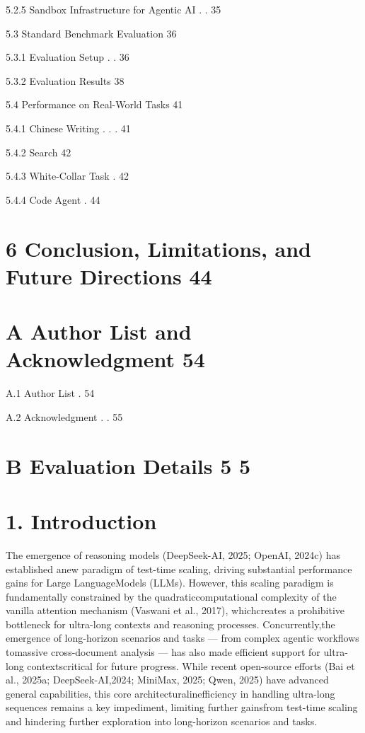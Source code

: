 \documentclass[
  10
]{article}
\begin{document}
5.2.5 Sandbox Infrastructure for Agentic AI . . 35

5.3 Standard Benchmark Evaluation 36

5.3.1 Evaluation Setup . . 36

5.3.2 Evaluation Results 38

5.4 Performance on Real-World Tasks 41

5.4.1 Chinese Writing . . . 41

5.4.2 Search 42

5.4.3 White-Collar Task . 42

5.4.4 Code Agent . 44

\section{6 Conclusion, Limitations, and Future Directions
44}\label{conclusion-limitations-and-future-directions-44}

\section{A Author List and Acknowledgment
54}\label{a-author-list-and-acknowledgment-54}

A.1 Author List . 54

A.2 Acknowledgment . . 55

\section{B Evaluation Details 5 5}\label{b-evaluation-details-5-5}

\section{1. Introduction}\label{introduction}

The emergence of reasoning models (DeepSeek-AI, 2025; OpenAI, 2024c) has
established anew paradigm of test-time scaling, driving substantial
performance gains for Large LanguageModels (LLMs). However, this scaling
paradigm is fundamentally constrained by the quadraticcomputational
complexity of the vanilla attention mechanism (Vaswani et al., 2017),
whichcreates a prohibitive bottleneck for ultra-long contexts and
reasoning processes. Concurrently,the emergence of long-horizon
scenarios and tasks --- from complex agentic workflows tomassive
cross-document analysis --- has also made efficient support for
ultra-long contextscritical for future progress. While recent
open-source efforts (Bai et al., 2025a; DeepSeek-AI,2024; MiniMax, 2025;
Qwen, 2025) have advanced general capabilities, this core
architecturalinefficiency in handling ultra-long sequences remains a key
impediment, limiting further gainsfrom test-time scaling and hindering
further exploration into long-horizon scenarios and tasks.
\end{document}
